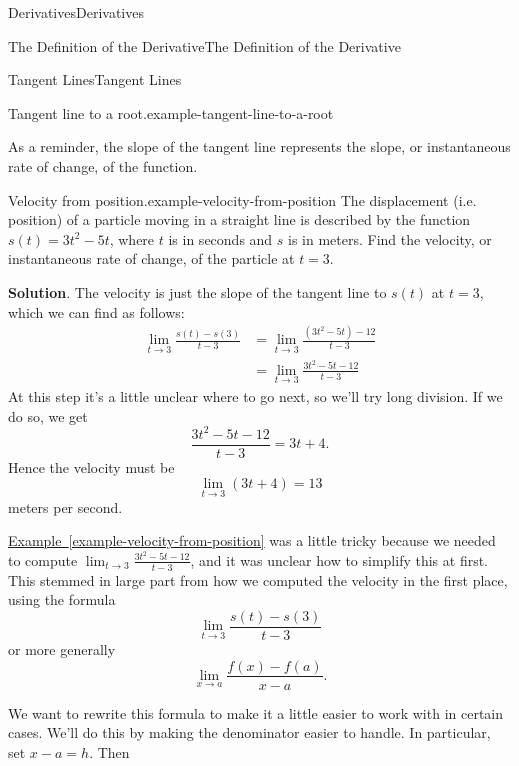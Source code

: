 \documentclass[10pt,]{book}
\numberwithin{equation}{section}
\begin{document}
\begin{chapterptx}{Derivatives}{}{Derivatives}{}{}
\begin{sectionptx}{The Definition of the Derivative}{}{The Definition of the Derivative}{}{}
\begin{subsectionptx}{Tangent Lines}{}{Tangent Lines}{}{}
\begin{example}{Tangent line to a root.}{example-tangent-line-to-a-root}
%
\end{example}
\hypertarget{p-82}{}%
As a reminder, the slope of the tangent line represents the slope, or instantaneous rate of change, of the function.%
\begin{example}{Velocity from position.}{example-velocity-from-position}%
\hypertarget{p-83}{}%
The displacement (i.e. position) of a particle moving in a straight line is described by the function \(s(t) = 3t^{2} - 5t\), where \(t\) is in seconds and \(s\) is in meters. Find the velocity, or instantaneous rate of change, of the particle at \(t=3\).%
\par\smallskip%
\noindent\textbf{Solution}.\hypertarget{solution-18}{}\quad%
\hypertarget{p-84}{}%
The velocity is just the slope of the tangent line to \(s(t)\) at \(t=3\), which we can find as follows:%
%
\begin{align*}
\lim_{t\to3}\frac{s(t) - s(3)}{t-3} & = \lim_{t\to3}\frac{(3t^{2} - 5t) - 12}{t-3} \\
& = \lim_{t\to3}\frac{3t^{2} - 5t - 12}{t-3} 
\end{align*}
\hypertarget{p-85}{}%
At this step it's a little unclear where to go next, so we'll try long division. If we do so, we get%
\begin{equation*}
\frac{3t^{2} - 5t - 12}{t-3} = 3t+4.
\end{equation*}
Hence the velocity must be%
\begin{equation*}
\lim_{t\to3}(3t+4) = 13
\end{equation*}
meters per second.%
\end{example}
\hypertarget{p-86}{}%
\hyperref[example-velocity-from-position]{Example~\ref{example-velocity-from-position}} was a little tricky because we needed to compute \(\lim_{t\to3}\frac{3t^{2}-5t-12}{t-3}\), and it was unclear how to simplify this at first. This stemmed in large part from how we computed the velocity in the first place, using the formula%
\begin{equation*}
\lim_{t\to3}\frac{s(t)-s(3)}{t-3}
\end{equation*}
or more generally%
\begin{equation*}
\lim_{x\to a}\frac{f(x) - f(a)}{x-a}\text{.}
\end{equation*}
%
\par
\hypertarget{p-87}{}%
We want to rewrite this formula to make it a little easier to work with in certain cases. We'll do this by making the denominator easier to handle. In particular, set \(x-a = h\). Then%
\begin{equation*}

\end{equation*}
\end{subsectionptx}
\end{sectionptx}
\end{chapterptx}
\end{document}
